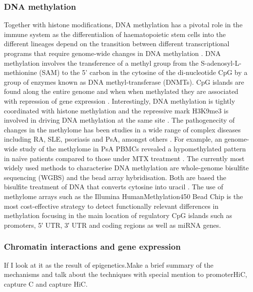 \subsubsection{DNA methylation}
Together with histone modifications, DNA methylation has a pivotal role in the immune system as the differentialion of haematopoietic stem cells into the different lineages depend on the transition between different transcriptional programs that require genome-wide changes in DNA methylation \parencite{Sellars2015,Lai2013}. DNA methylation involves the transference of a methyl group from the S-adenosyl-L-methionine (SAM) to the 5' carbon in the cytosine of the di-nucleotide CpG by a group of enzymes known as DNA methyl-transferase (DNMTs). CpG islands are found along the entire genome and when when methylated they are associated with repression of gene expression \parencite{Herman2003}. Interestingly, DNA methylation is tightly coordinated with histone methylation and the repressive mark H3K9me3 is involved in driving DNA methylation at the same site \parencite{Rottach2009}. %
The pathogenecity of changes in the methylome has been studies in a wide range of complex diseases including RA, SLE, psoriasis and PsA, amongst others \parencite{Lei2009,Liu2013,Zhang2010}. For example, an genome-wide study of the methylome in PsA PBMCs revealed a hypomethylated pattern in na\"{i}ve patients compared to those under MTX treatment \parencite{Kim1996}.
The currently most widely used methods to characterise DNA methylation are whole-genome bisulfite sequencing (WGBS) and the bead array hybridisation. Both are based the bisulfite treatment of DNA that converts cytosine into uracil \parencite{Frommer1992,Miura2014,Dedeurwaerder2013}. The use of methylome arrays such as the Illumina HumanMethylation450 Bead Chip is the most cost-effective strategy to detect functionally relevant differences in methylation focusing in the main location of regulatory CpG islands such as promoters, 5′ UTR, 3′ UTR and coding regions as well as miRNA genes.

\subsubsection{Chromatin interactions and gene expression}
If I look at it as the result of epigenetics.Make a brief summary of the mechanisms and talk about the techniques with special mention to promoterHiC, capture C and capture HiC.

